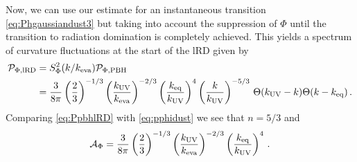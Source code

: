 \documentclass[a4paper,11pt]{article}
\numberwithin{equation}{section}
\begin{document}
Now, we can use our estimate for an instantaneous transition \eqref{eq:Phgaussiandust3} but taking into account the suppression of $\Phi$ until the transition to radiation domination is completely achieved. This yields a spectrum of curvature fluctuations at the start of the lRD given by
\begin{align}\label{eq:PpbhlRD}
{\cal P}_{\Phi,{\rm lRD}}&=S^2_\Phi(k/k_{\rm eva}){\cal P}_{\Phi,{\rm PBH}}\nonumber\\&=\frac{3}{8\pi}\left({\frac{2}{3}}\right)^{-1/3}\left(\frac{k_{\rm UV}}{k_{\rm eva}}\right)^{-2/3}\left(\frac{k_{\rm eq}}{k_{\rm UV}}\right)^4\left(\frac{k}{k_{\rm UV}}\right)^{-5/3}\,\Theta(k_{\rm UV}-k)\Theta(k-k_{\rm eq})\,.
\end{align}
Comparing \eqref{eq:PpbhlRD} with \eqref{eq:pphidust} we see that $n=5/3$ and
\begin{align}
{\cal A}_\Phi=\frac{3}{8\pi}\left({\frac{2}{3}}\right)^{-1/3}\left(\frac{k_{\rm UV}}{k_{\rm eva}}\right)^{-2/3}\left(\frac{k_{\rm eq}}{k_{\rm UV}}\right)^4\,.
\end{align}
\end{document}
